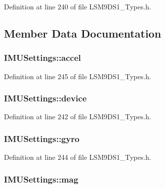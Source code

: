 Definition at line 240 of file L\+S\+M9\+D\+S1\+\_\+\+Types.\+h.



\subsection{Member Data Documentation}
\subsubsection[{\texorpdfstring{accel}{accel}}]{ I\+M\+U\+Settings\+::accel}\hypertarget{struct_i_m_u_settings_aa8c7bf392c70397ae02ee1f5ad0ea474}{}\label{struct_i_m_u_settings_aa8c7bf392c70397ae02ee1f5ad0ea474}


Definition at line 245 of file L\+S\+M9\+D\+S1\+\_\+\+Types.\+h.

\subsubsection[{\texorpdfstring{device}{device}}]{ I\+M\+U\+Settings\+::device}\hypertarget{struct_i_m_u_settings_a22b2648befc58307b43edc9e74acd583}{}\label{struct_i_m_u_settings_a22b2648befc58307b43edc9e74acd583}


Definition at line 242 of file L\+S\+M9\+D\+S1\+\_\+\+Types.\+h.

\subsubsection[{\texorpdfstring{gyro}{gyro}}]{ I\+M\+U\+Settings\+::gyro}\hypertarget{struct_i_m_u_settings_afab65feef7d0ca778b035a8805b1e4bf}{}\label{struct_i_m_u_settings_afab65feef7d0ca778b035a8805b1e4bf}


Definition at line 244 of file L\+S\+M9\+D\+S1\+\_\+\+Types.\+h.

\subsubsection[{\texorpdfstring{mag}{mag}}]{ I\+M\+U\+Settings\+::mag}\hypertarget{struct_i_m_u_settings_aca08359dfa3b8120aa687680d6c06ba7}{}\label{struct_i_m_u_settings_aca08359dfa3b8120aa687680d6c06ba7}


